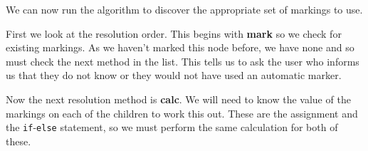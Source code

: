 \documentclass[twoside,a4paper]{report}
\begin{document}


We can now run the algorithm to discover the appropriate set of markings to use.

First we look at the resolution order. This begins with \textbf{mark} so we check for existing markings. As we haven't marked this node before,
we have none and so must check the next method in the list. This tells us to ask the user who informs us that they do not know or they would not
have used an automatic marker.

Now the next resolution method is \textbf{calc}. We will need to know the value of the markings on each of the children to work this out. These
are the assignment and the \texttt{if}-\texttt{else} statement, so we must perform the same calculation for both of these.
\end{document}
